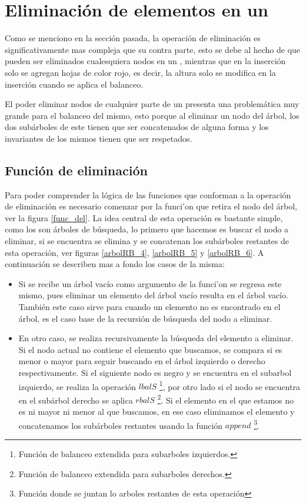 \section{Eliminación de elementos en un {\arn}}

Como se menciono en la secci\'on pasada, la operaci\'on de eliminaci\'on es significativamente mas
compleja que su contra parte, esto se debe al hecho de que pueden ser eliminados cualesquiera nodos
 en un {\arn}, mientras que en la inserci\'on solo se agregan hojas de color rojo, es decir,
la altura solo se modifica en la inserción cuando se aplica el balanceo.

El poder eliminar nodos de cualquier parte de un {\arn} presenta una problemática muy grande para
el balanceo del mismo, esto porque al eliminar un nodo del \'arbol, los dos subárboles de este
tienen que ser concatenados de alguna forma y los invariantes de los mismos tienen que ser
respetados.

\subsection{Funci\'on de eliminaci\'on}

Para poder comprender la l\'ogica de las funciones que conforman a la operaci\'on de eliminaci\'on
es necesario comenzar por la funci'on que retira el nodo del \'arbol, ver la figura \ref{func_del}.
La idea central de esta operaci\'on es bastante simple, como los {\arns} son \'arboles de búsqueda,
lo primero que hacemos es buscar el nodo a eliminar, si se encuentra se elimina y se concatenan los
subárboles restantes de esta operaci\'on, ver figuras \ref{arbolRB_4}, \ref{arbolRB_5} y
\ref{arbolRB_6}. A continuaci\'on se describen mas a fondo los casos de la misma:

\begin{itemize}
    \item Si se recibe un \'arbol vacío como argumento de la funci'on se regresa este mismo, pues
    eliminar un elemento del \'arbol vacío resulta en el \'arbol vacío. También este caso sirve para
    cuando un elemento no es encontrado en el \'arbol, es el caso base de la recursi\'on de
    búsqueda del nodo a eliminar.
    \item En otro caso, se realiza recursivamente la búsqueda del elemento a eliminar. Si el nodo
    actual no contiene el elemento que buscamos, se compara si es menor o mayor para seguir
    buscando en el \'arbol izquierdo o derecho respectivamente. Si el siguiente nodo es negro y se
    encuentra en el subarbol izquierdo, se realiza la operaci\'on $lbalS$ \footnote{Funci\'on de
    balanceo extendida para subarboles izquierdos.}, por otro lado si el nodo se encuentra en el
    sub\'arbol derecho se aplica $rbalS$ \footnote{Funci\'on de balanceo extendida para subarboles
    derechos.}. Si el elemento en el que estamos no es ni mayor ni menor al que buscamos, en ese
    caso eliminamos el elemento y concatenamos los subárboles restantes usando la función $append$
    \footnote{Funci\'on donde se juntan lo arboles restantes de esta operaci\'on}.
\end{itemize}

